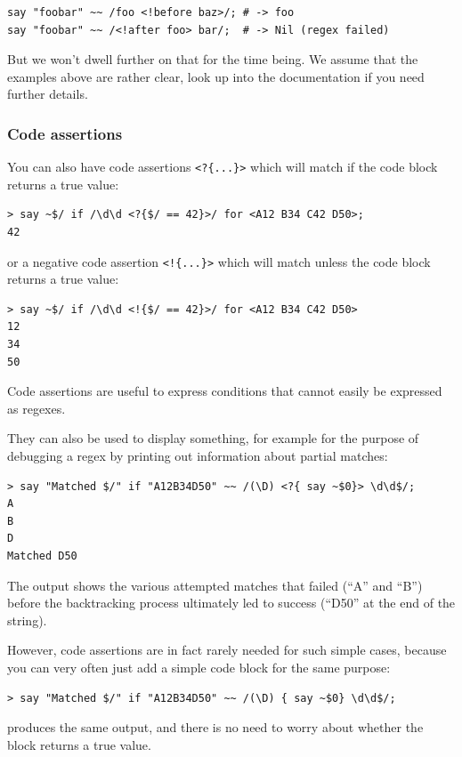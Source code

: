 \begin{verbatim}
say "foobar" ~~ /foo <!before baz>/; # -> foo 
say "foobar" ~~ /<!after foo> bar/;  # -> Nil (regex failed)
\end{verbatim}
%
But we won't dwell further on that for the time being. We assume 
that the examples above are rather clear, look up into the 
documentation if you need further details. 

\subsubsection{Code assertions}

You can also have code assertions \verb'<?{...}>' which 
will match if the code block returns a true value:

\begin{verbatim}
> say ~$/ if /\d\d <?{$/ == 42}>/ for <A12 B34 C42 D50>;
42
\end{verbatim}

or a negative code assertion \verb'<!{...}>' which will 
match unless the code block returns a true value:
\begin{verbatim}
> say ~$/ if /\d\d <!{$/ == 42}>/ for <A12 B34 C42 D50>
12
34
50
\end{verbatim}

Code assertions are useful to express conditions that 
cannot easily be expressed as regexes. 

They can also be used to display something, for example 
for the purpose of debugging a regex by printing out 
information about partial matches:

\begin{verbatim}
> say "Matched $/" if "A12B34D50" ~~ /(\D) <?{ say ~$0}> \d\d$/;
A
B
D
Matched D50
\end{verbatim}

The output shows the various attempted matches that 
failed (``A'' and ``B'') before the backtracking 
process ultimately led to success (``D50'' at the end 
of the string).

However, code assertions are in fact rarely needed for 
such simple cases, because you can very often just add 
a simple code block for the same purpose:
%
\begin{verbatim}
> say "Matched $/" if "A12B34D50" ~~ /(\D) { say ~$0} \d\d$/;
\end{verbatim}
produces the same output, and there is no need to worry about 
whether the block returns a true value.


